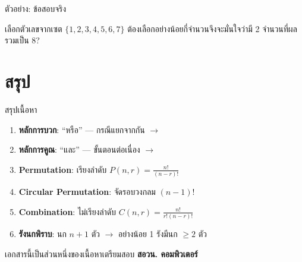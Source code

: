 \documentclass[11pt, aspectratio=169]{beamer}
\begin{document}
\begin{frame}[t]{ตัวอย่าง: ข้อสอบจริง}
  \begin{exambox}[โจทย์ปี 68 ข้อ 21]
    เลือกตัวเลขจากเซต $\{1, 2, 3, 4, 5, 6, 7\}$
    ต้องเลือกอย่างน้อยกี่จำนวนจึงจะมั่นใจว่ามี 2 จำนวนที่ผลรวมเป็น 8?
  \end{exambox}

  \vspace{\fill}
\end{frame}

\section{สรุป}

\begin{frame}{สรุปเนื้อหา}
  \begin{explanation}[สิ่งที่ได้เรียนรู้]
    \begin{enumerate}
      \item \textbf{หลักการบวก}: ``หรือ'' — กรณีแยกจากกัน $\rightarrow$ 
      \item \textbf{หลักการคูณ}: ``และ'' — ขั้นตอนต่อเนื่อง $\rightarrow$ 
      \item \textbf{Permutation}: เรียงลำดับ \quad $P(n,r) = \frac{n!}{(n-r)!}$
      \item \textbf{Circular Permutation}: จัดรอบวงกลม \quad $(n-1)!$
      \item \textbf{Combination}: ไม่เรียงลำดับ \quad $C(n,r) = \frac{n!}{r!(n-r)!}$
      \item \textbf{รังนกพิราบ}: นก $n+1$ ตัว $\rightarrow$ อย่างน้อย 1 รังมีนก $\geq 2$ ตัว
    \end{enumerate}
  \end{explanation}

  \begin{center}
    \large เอกสารนี้เป็นส่วนหนึ่งของเนื้อหาเตรียมสอบ \textbf{สอวน. คอมพิวเตอร์}
  \end{center}
\end{frame}
\end{document}
